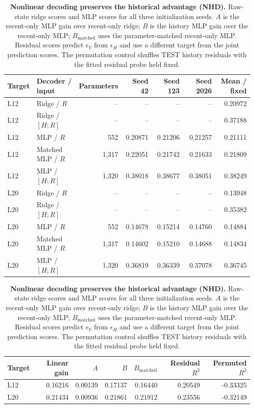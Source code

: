 \begin{table}[t]
\centering\small
\caption{\textbf{Nonlinear decoding preserves the historical advantage (NHD).} Raw-state ridge scores and MLP scores for all three initialization seeds. $A$ is the recent-only MLP gain over recent-only ridge; $B$ is the history MLP gain over the recent-only MLP; $B_{\mathrm{matched}}$ uses the parameter-matched recent-only MLP. Residual scores predict $\epsilon_Y$ from $\epsilon_H$ and use a different target from the joint prediction scores. The permutation control shuffles TEST history residuals with the fitted residual probe held fixed.}
\label{tab:nonlinear}
\begin{tabular}{llrrrrr}
\toprule
Target & Decoder / input & Parameters & Seed 42 & Seed 123 & Seed 2026 & Mean / fixed\\
\midrule
L12 & Ridge / $R$ & -- & -- & -- & -- & 0.20972 \\
L12 & Ridge / $[H;R]$ & -- & -- & -- & -- & 0.37188 \\
L12 & MLP / $R$ & 552 & 0.20871 & 0.21206 & 0.21257 & 0.21111 \\
L12 & Matched MLP / $R$ & 1,317 & 0.22051 & 0.21742 & 0.21633 & 0.21809 \\
L12 & MLP / $[H;R]$ & 1,320 & 0.38018 & 0.38677 & 0.38051 & 0.38249 \\
\midrule
L20 & Ridge / $R$ & -- & -- & -- & -- & 0.13948 \\
L20 & Ridge / $[H;R]$ & -- & -- & -- & -- & 0.35382 \\
L20 & MLP / $R$ & 552 & 0.14678 & 0.15214 & 0.14760 & 0.14884 \\
L20 & Matched MLP / $R$ & 1,317 & 0.14602 & 0.15210 & 0.14688 & 0.14834 \\
L20 & MLP / $[H;R]$ & 1,320 & 0.36819 & 0.36339 & 0.37078 & 0.36745 \\
\bottomrule
\end{tabular}
\par\smallskip
\begin{tabular}{lrrrrrr}
\toprule
Target & Linear gain & $A$ & $B$ & $B_{\mathrm{matched}}$ & Residual $R^2$ & Permuted $R^2$\\
\midrule
L12 & 0.16216 & 0.00139 & 0.17137 & 0.16440 & 0.20549 & -0.33325 \\
L20 & 0.21434 & 0.00936 & 0.21861 & 0.21912 & 0.23556 & -0.32149 \\
\bottomrule
\end{tabular}
\end{table}
